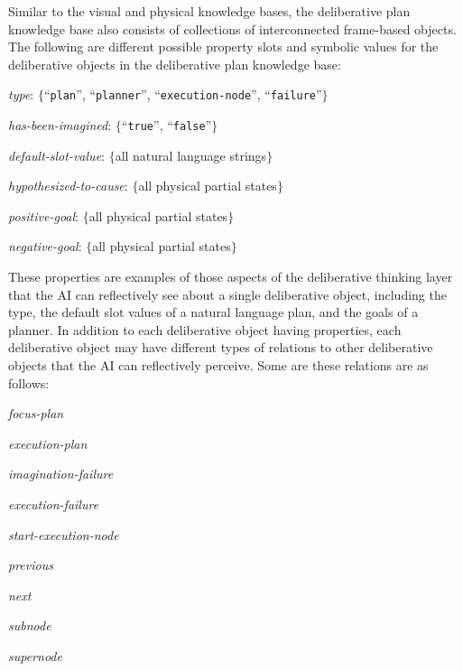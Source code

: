 Similar to the visual and physical knowledge bases, the deliberative
plan knowledge base also consists of collections of interconnected
frame-based objects.  The following are different possible property
slots and symbolic values for the deliberative objects in the
deliberative plan knowledge base:
\begin{samepage}
  \begin{packed_itemize}
  \item{{\emph{type}}: $\{$``{\tt{plan}}'', ``{\tt{planner}}'', ``{\tt{execution-node}}'', ``{\tt{failure}}''$\}$}
  \item{{\emph{has-been-imagined}}: $\{$``{\tt{true}}'', ``{\tt{false}}''$\}$}
  \item{{\emph{default-slot-value}}: $\{$all natural language strings$\}$}
  \item{{\emph{hypothesized-to-cause}}: $\{$all physical partial states$\}$}
  \item{{\emph{positive-goal}}: $\{$all physical partial states$\}$}
  \item{{\emph{negative-goal}}: $\{$all physical partial states$\}$}
  \end{packed_itemize}
\end{samepage}
These properties are examples of those aspects of the deliberative
thinking layer that the AI can reflectively see about a single
deliberative object, including the type, the default slot values of a
natural language plan, and the goals of a planner.  In addition to
each deliberative object having properties, each deliberative object
may have different types of relations to other deliberative objects
that the AI can reflectively perceive.  Some are these relations are
as follows:
\begin{samepage}
  \begin{packed_itemize}
  \item{\emph{focus-plan}}
  \item{\emph{execution-plan}}
  \item{\emph{imagination-failure}}
  \item{\emph{execution-failure}}
  \item{\emph{start-execution-node}}
  \item{\emph{previous}}
  \item{\emph{next}}
  \item{\emph{subnode}}
  \item{\emph{supernode}}
  \end{packed_itemize}
\end{samepage}
